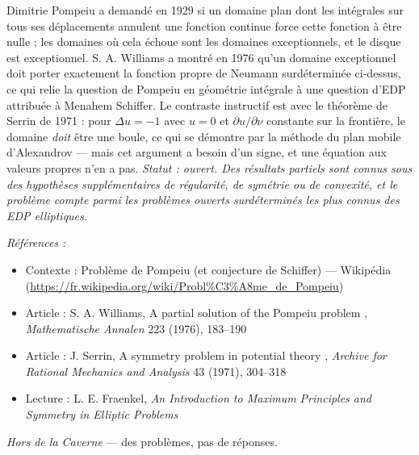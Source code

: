 \documentclass[11pt]{article}
\newenvironment{refs}{\par\small\noindent\emph{Références :}\begin{itemize}\setlength\itemsep{0pt}}{\end{itemize}\normalsize}
\begin{document}
\noindent Dimitrie Pompeiu a demandé en 1929 si un domaine plan dont les intégrales sur
tous ses déplacements annulent une fonction continue force cette fonction à être nulle ; les
domaines où cela échoue sont les domaines exceptionnels, et le disque est exceptionnel. S. A.
Williams a montré en 1976 qu'un domaine exceptionnel doit porter exactement la fonction propre de
Neumann surdéterminée ci-dessus, ce qui relie la question de Pompeiu en géométrie intégrale à une
question d'EDP attribuée à Menahem Schiffer. Le contraste instructif est avec le théorème de Serrin
de 1971 : pour $\Delta u = -1$ avec $u = 0$ et $\partial u/\partial \nu$ constante sur la
frontière, le domaine \textit{doit} être une boule, ce qui se démontre par la méthode du plan mobile
d'Alexandrov --- mais cet argument a besoin d'un signe, et une équation aux valeurs propres n'en a
pas. \textit{Statut : ouvert. Des résultats partiels sont connus sous des hypothèses supplémentaires de
régularité, de symétrie ou de convexité, et le problème compte parmi les problèmes ouverts
surdéterminés les plus connus des EDP elliptiques.}

\begin{refs}
\item Contexte : Problème de Pompeiu (et conjecture de Schiffer) --- Wikipédia (\url{https://fr.wikipedia.org/wiki/Probl%C3%A8me_de_Pompeiu})
\item Article : S. A. Williams, \og{} A partial solution of the Pompeiu problem \fg{}, \textit{Mathematische Annalen} 223 (1976), 183--190
\item Article : J. Serrin, \og{} A symmetry problem in potential theory \fg{}, \textit{Archive for Rational Mechanics and Analysis} 43 (1971), 304--318
\item Lecture : L. E. Fraenkel, \textit{An Introduction to Maximum Principles and Symmetry in Elliptic Problems}
\end{refs}

\bigskip


\vfill
\noindent\emph{Hors de la Caverne} --- des probl\`emes, pas de r\'eponses.
\end{document}
